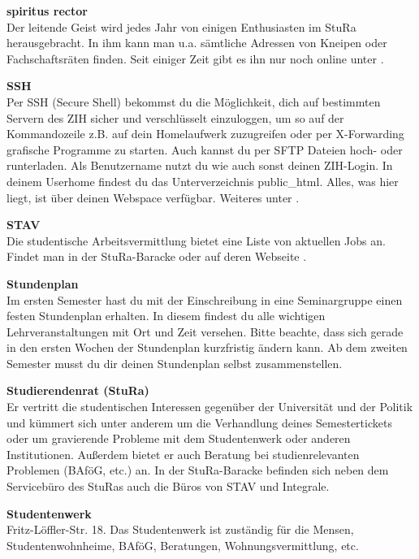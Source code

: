 \begin{multicols}{2}
\textbf{spiritus rector} \\
Der \glqq leitende Geist\grqq{} wird jedes Jahr von einigen Enthusiasten im StuRa herausgebracht.
In ihm kann man u.a. sämtliche Adressen von Kneipen oder Fachschaftsräten finden. Seit einiger Zeit gibt es ihn nur noch online unter .



\textbf{SSH} \\
Per SSH (Secure Shell) bekommst du die Möglichkeit, dich auf bestimmten Servern des ZIH sicher und verschlüsselt einzuloggen, um so auf der Kommandozeile z.B. auf dein Homelaufwerk zuzugreifen oder per X-Forwarding grafische Programme zu starten.
Auch kannst du per SFTP Dateien hoch- oder runterladen.
Als Benutzername nutzt du wie auch sonst deinen ZIH-Login.
In deinem Userhome findest du das Unterverzeichnis public\_html.
Alles, was hier liegt, ist über deinen Webspace verfügbar. 
Weiteres unter .

\textbf{STAV} \\
Die studentische Arbeitsvermittlung bietet eine Liste von aktuellen Jobs an.
Findet man in der StuRa-Baracke oder auf deren Webseite .

\textbf{Stundenplan} \\
Im ersten Semester hast du mit der Einschreibung in eine Seminargruppe einen festen Stundenplan erhalten. In diesem findest du alle wichtigen Lehrveranstaltungen mit Ort und Zeit versehen. Bitte beachte, dass sich gerade in den ersten Wochen der Stundenplan kurzfristig ändern kann.
Ab dem zweiten Semester musst du dir deinen Stundenplan selbst zusammenstellen.

\vfill\columnbreak

\textbf{Studierendenrat (StuRa)} \\
Er vertritt die studentischen Interessen gegenüber der Universität und der Politik und kümmert sich unter anderem um die Verhandlung deines Semestertickets oder um gravierende Probleme mit dem Studentenwerk oder anderen Institutionen.
Außerdem bietet er auch Beratung bei studienrelevanten Problemen (BAföG, etc.) an.
In der StuRa-Baracke befinden sich neben dem Servicebüro des StuRas auch die Büros von STAV und Integrale. 

\textbf{Studentenwerk} \\
Fritz-Löffler-Str. 18.
Das Studentenwerk ist zuständig für die Mensen, Studentenwohnheime, BAföG, Beratungen, Wohnungsvermittlung, etc. 


\end{multicols}
